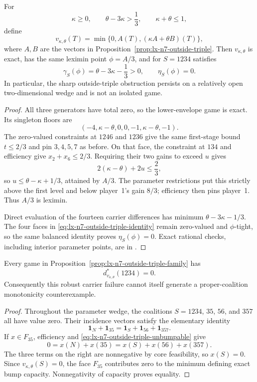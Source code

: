 \begin{proposition}
\label{prop:lx-n7-outside-triple-family}
For
\[
 \kappa\geq0,\qquad \theta-3\kappa>\frac13,
 \qquad \kappa+\theta\leq1,
\]
define
\[
 v_{\kappa,\theta}(T)
  =\min\{0,A(T),(\kappa A+\theta B)(T)\},
\]
where $A,B$ are the vectors in
Proposition~\ref{prop:lx-n7-outside-triple}.  Then $v_{\kappa,\theta}$ is
exact, has the same leximin point $\phi=A/3$, and for $S=1234$ satisfies
\[
 \gamma_S(\phi)=\theta-3\kappa-\frac13>0,
 \qquad \eta_S(\phi)=0.
\]
In particular, the sharp outside-triple obstruction persists on a relatively
open two-dimensional wedge and is not an isolated game.
\end{proposition}

\begin{proof}
All three generators have total zero, so the lower-envelope game is exact.
Its singleton floors are
\[
 (-4,\kappa-\theta,0,0,-1,\kappa-\theta,-1).
\]
The zero-valued constraints at $1246$ and $1236$ give the same first-stage
bound $t\leq2/3$ and pin $3,4,5,7$ as before.  On that face, the constraint
at $134$ and efficiency give $x_2+x_6\leq2/3$.  Requiring their two gains
to exceed $u$ gives
\[
 2(\kappa-\theta)+2u\leq\frac23,
\]
so $u\leq\theta-\kappa+1/3$, attained by $A/3$.  The parameter restrictions
put this strictly above the first level and below player~1's gain $8/3$;
efficiency then pins player~1.  Thus $A/3$ is leximin.

Direct evaluation of the fourteen carrier differences has minimum
$\theta-3\kappa-1/3$.  The four faces in
\eqref{eq:lx-n7-outside-triple-identity} remain zero-valued and
$\phi$-tight, so the same balanced identity proves $\eta_S(\phi)=0$.
Exact rational checks, including interior parameter points, are in
.
\end{proof}

\begin{corollary}
\label{cor:lx-n7-outside-triple-unbumpable}
Every game in Proposition~\ref{prop:lx-n7-outside-triple-family} has
\[
 d^*_{v_{\kappa,\theta}}(1234)=0.
\]
Consequently this robust carrier failure cannot itself generate a
proper-coalition monotonicity counterexample.
\end{corollary}

\begin{proof}
Throughout the parameter wedge, the coalitions $S=1234$, $35$, $56$, and
$357$ all have value zero.  Their incidence vectors satisfy the elementary
identity
\[
 \mathbf1_N+\mathbf1_{35}
 =\mathbf1_S+\mathbf1_{56}+\mathbf1_{357}.       \tag{UB}
 \label{eq:lx-n7-outside-triple-unbumpable}
\]
If $x\in F_{35}$, efficiency and \eqref{eq:lx-n7-outside-triple-unbumpable}
give
\[
 0=x(N)+x(35)=x(S)+x(56)+x(357).
\]
The three terms on the right are nonnegative by core feasibility, so
$x(S)=0$.  Since $v_{\kappa,\theta}(S)=0$, the face $F_{35}$ contributes
zero to the minimum defining exact bump capacity.  Nonnegativity of capacity
proves equality.
\end{proof}

